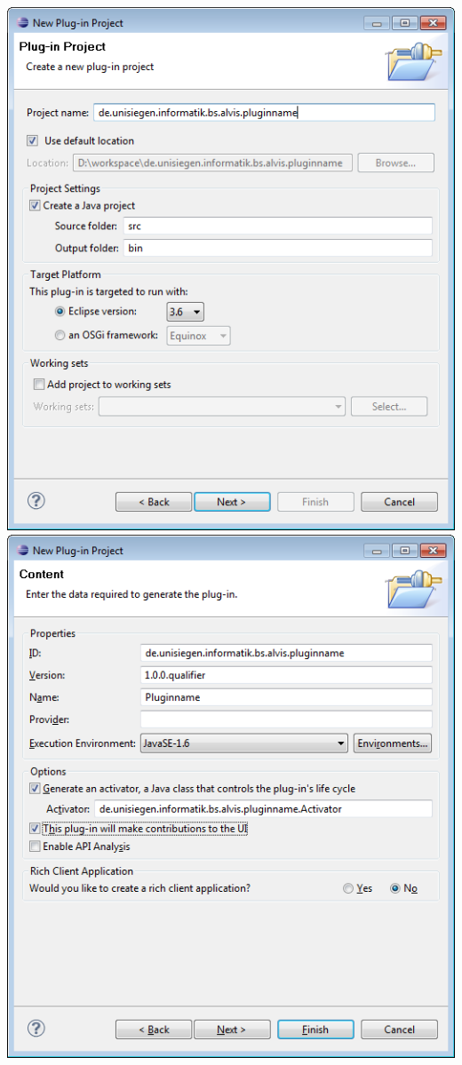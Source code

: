 \documentclass[10pt,a4paper]{article}
\begin{document}
\begin{center}
\includegraphics[scale=0.449]{images/new_plugin_datatypes_03}
\\
\includegraphics[scale=0.449]{images/new_plugin_datatypes_04}
\end{center}
\end{document}
